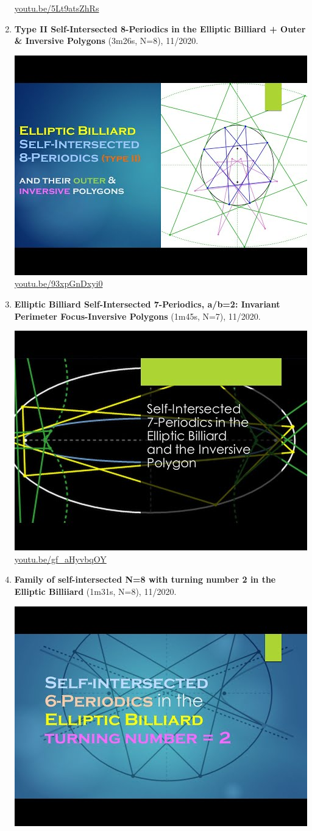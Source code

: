 \documentclass[12pt]{amsart}
\begin{document}
\begin{enumerate}[resume]
\begin{center}
\href{https://youtu.be/5Lt9atsZhRs}{\url{youtu.be/5Lt9atsZhRs}}\end{center}
% 
\item \textbf{Type II Self-Intersected 8-Periodics in the Elliptic Billiard + Outer \& Inversive Polygons} (3m26s, N=8), 11/2020. 
\begin{center}\includegraphics[width=.5\textwidth]{pics/93xpGnDxyi0.jpg} \\ 
\href{https://youtu.be/93xpGnDxyi0}{\url{youtu.be/93xpGnDxyi0}}\end{center}
% 
\item \textbf{Elliptic Billiard Self-Intersected 7-Periodics, a/b=2: Invariant Perimeter Focus-Inversive Polygons} (1m45s, N=7), 11/2020. 
\begin{center}\includegraphics[width=.5\textwidth]{pics/gf_aHyvbqOY.jpg} \\ 
\href{https://youtu.be/gf_aHyvbqOY}{\url{youtu.be/gf\_aHyvbqOY}}\end{center}
% 
\item \textbf{Family of self-intersected N=8 with turning number 2 in the Elliptic Billiiard} (1m31s, N=8), 11/2020. 
\begin{center}\includegraphics[width=.5\textwidth]{pics/JwD_w5ecPYs.jpg} \\ 

\end{center}
\end{enumerate}
\end{document}
